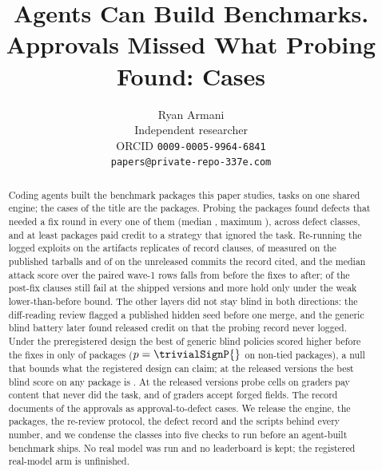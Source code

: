 \documentclass{article}
\title{Agents Can Build Benchmarks. Approvals Missed What Probing Found: \suitePackages{} Cases}
\author{%
  Ryan Armani\\
  Independent researcher\\
  ORCID \texttt{0009-0005-9964-6841}\\
  \texttt{papers@private-repo-337e.com}\\
}
\begin{document}
\maketitle

\begin{abstract}
Coding agents built the \suitePackages{} benchmark packages this paper studies, \suiteTasks{} tasks on one shared engine; the \suitePackages{} cases of the title are the packages. Probing the packages found defects that needed a fix round in every one of them (median \reviewRoundsMedian{}, maximum \reviewRoundsMax{}), across  defect classes, and at least  packages paid credit to a strategy that ignored the task. Re-running the logged exploits on the artifacts replicates \expExplReplicated{} of \expExplRecordClauses{} record clauses, \expExplReplReleased{} of \expExplRecordReleased{} measured on the published tarballs and \expExplReplCommit{} of \expExplRecordCommit{} on the unreleased commits the record cited, and the median attack score over the \expExplAtkPairs{} paired wave-1 rows falls from \expExplAtkMedianOldPaired{} before the fixes to \expExplAtkMedianNewPaired{} after; \expExplFixFails{} of the \expExplPostfixClauses{} post-fix clauses still fail at the shipped versions and \expExplFixHoldsWeak{} more hold only under the weak lower-than-before bound. The other layers did not stay blind in both directions: the diff-reading review flagged a published hidden seed before one merge, and the generic blind battery later found released credit on \expTrivialReleasedMaxPkgs{} that the probing record never logged. Under the preregistered design the best of \trivialPolicies{} generic blind policies scored higher before the fixes in only \trivialHigherOld{} of \trivialPackages{} packages ($p = \trivialSignP{}$ on \trivialSignN{} non-tied packages), a null that bounds what the registered design can claim; at the released versions the best blind score on any package is \expTrivialReleasedMax{}. At the released versions \expProbesCreditFailCells{} probe cells on \expProbesCreditFailPkgCount{} graders pay content that never did the task, and \expProbesForgedAccepted{} of \expPackages{} graders accept forged fields. The record documents \approvalDefectCases{} of the \councilMergedApproved{} approvals as approval-to-defect cases. We release the engine, the packages, the re-review protocol, the defect record and the scripts behind every number, and we condense the classes into five checks to run before an agent-built benchmark ships. No real model was run and no leaderboard is kept; the registered real-model arm is unfinished.
\end{abstract}
\end{document}
